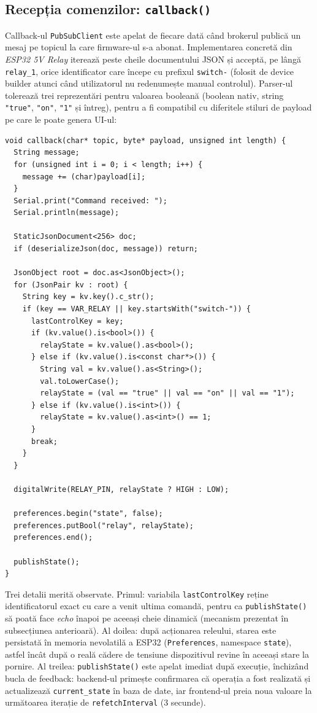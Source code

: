 \subsection{Recepția comenzilor: \texttt{callback()}}
Callback-ul \texttt{PubSubClient} este apelat de fiecare dată când brokerul publică un mesaj pe topicul la care firmware-ul s-a abonat. Implementarea concretă din \emph{ESP32 5V Relay} iterează peste cheile documentului JSON și acceptă, pe lângă \texttt{relay\_1}, orice identificator care începe cu prefixul \texttt{switch-} (folosit de device builder atunci când utilizatorul nu redenumește manual controlul). Parser-ul tolerează trei reprezentări pentru valoarea booleană (boolean nativ, string \texttt{"true"}, \texttt{"on"}, \texttt{"1"} și întreg), pentru a fi compatibil cu diferitele stiluri de payload pe care le poate genera UI-ul:
\begin{verbatim}
void callback(char* topic, byte* payload, unsigned int length) {
  String message;
  for (unsigned int i = 0; i < length; i++) {
    message += (char)payload[i];
  }
  Serial.print("Command received: ");
  Serial.println(message);

  StaticJsonDocument<256> doc;
  if (deserializeJson(doc, message)) return;

  JsonObject root = doc.as<JsonObject>();
  for (JsonPair kv : root) {
    String key = kv.key().c_str();
    if (key == VAR_RELAY || key.startsWith("switch-")) {
      lastControlKey = key;
      if (kv.value().is<bool>()) {
        relayState = kv.value().as<bool>();
      } else if (kv.value().is<const char*>()) {
        String val = kv.value().as<String>();
        val.toLowerCase();
        relayState = (val == "true" || val == "on" || val == "1");
      } else if (kv.value().is<int>()) {
        relayState = kv.value().as<int>() == 1;
      }
      break;
    }
  }

  digitalWrite(RELAY_PIN, relayState ? HIGH : LOW);

  preferences.begin("state", false);
  preferences.putBool("relay", relayState);
  preferences.end();

  publishState();
}
\end{verbatim}
Trei detalii merită observate. Primul: variabila \texttt{lastControlKey} reține identificatorul exact cu care a venit ultima comandă, pentru ca \texttt{publishState()} să poată face \emph{echo} înapoi pe aceeași cheie dinamică (mecanism prezentat în subsecțiunea anterioară). Al doilea: după acționarea releului, starea este persistată în memoria nevolatilă a ESP32 (\texttt{Preferences}, namespace \texttt{state}), astfel încât după o reală cădere de tensiune dispozitivul revine în aceeași stare la pornire. Al treilea: \texttt{publishState()} este apelat imediat după execuție, închizând bucla de feedback: backend-ul primește confirmarea că operația a fost realizată și actualizează \texttt{current\_state} în baza de date, iar frontend-ul preia noua valoare la următoarea iterație de \texttt{refetchInterval} (3 secunde).

